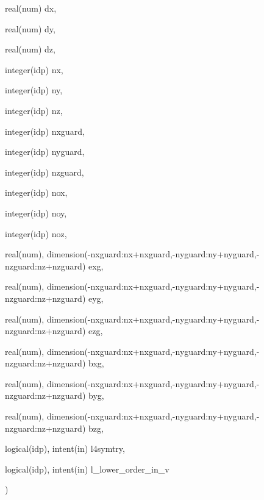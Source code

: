 {\begin{DoxyParamCaption}
\item[{real(num)}]{dx, }
\item[{real(num)}]{dy, }
\item[{real(num)}]{dz, }
\item[{integer(idp)}]{nx, }
\item[{integer(idp)}]{ny, }
\item[{integer(idp)}]{nz, }
\item[{integer(idp)}]{nxguard, }
\item[{integer(idp)}]{nyguard, }
\item[{integer(idp)}]{nzguard, }
\item[{integer(idp)}]{nox, }
\item[{integer(idp)}]{noy, }
\item[{integer(idp)}]{noz, }
\item[{real(num), dimension(-\/nxguard\+:nx+nxguard,-\/nyguard\+:ny+nyguard,-\/nzguard\+:nz+nzguard)}]{exg, }
\item[{real(num), dimension(-\/nxguard\+:nx+nxguard,-\/nyguard\+:ny+nyguard,-\/nzguard\+:nz+nzguard)}]{eyg, }
\item[{real(num), dimension(-\/nxguard\+:nx+nxguard,-\/nyguard\+:ny+nyguard,-\/nzguard\+:nz+nzguard)}]{ezg, }
\item[{real(num), dimension(-\/nxguard\+:nx+nxguard,-\/nyguard\+:ny+nyguard,-\/nzguard\+:nz+nzguard)}]{bxg, }
\item[{real(num), dimension(-\/nxguard\+:nx+nxguard,-\/nyguard\+:ny+nyguard,-\/nzguard\+:nz+nzguard)}]{byg, }
\item[{real(num), dimension(-\/nxguard\+:nx+nxguard,-\/nyguard\+:ny+nyguard,-\/nzguard\+:nz+nzguard)}]{bzg, }
\item[{logical(idp), intent(in)}]{l4symtry, }
\item[{logical(idp), intent(in)}]{l\+\_\+lower\+\_\+order\+\_\+in\+\_\+v}
\end{DoxyParamCaption}
)}\hypertarget{field__gathering__2d_8_f90_a6d4781dd6cacd0867443a1d9ff142ad7}{}\label{field__gathering__2d_8_f90_a6d4781dd6cacd0867443a1d9ff142ad7}
